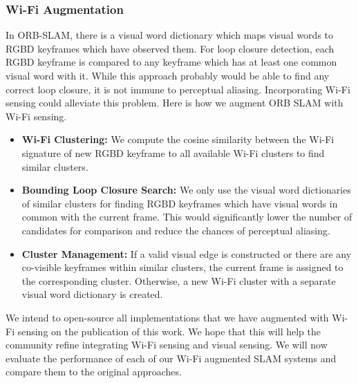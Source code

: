 \subsubsection{\textbf{Wi-Fi Augmentation}}
In ORB-SLAM, there is a visual word dictionary which maps visual words to RGBD keyframes which have observed them. For loop closure detection, each RGBD keyframe is compared to any keyframe which has at least one common visual word with it. While this approach probably would be able to find any correct loop closure, it is not immune to perceptual aliasing. Incorporating Wi-Fi sensing could alleviate this problem. Here is how we augment ORB SLAM with Wi-Fi sensing.
\begin{itemize}
\item \textbf{Wi-Fi Clustering:} We compute the cosine similarity between the Wi-Fi signature of new RGBD keyframe to all available Wi-Fi clusters to find {similar clusters}. 
\item \textbf{Bounding Loop Closure Search:} We only use the visual word dictionaries of {similar clusters} for finding RGBD keyframes which have visual words in common with the current frame. This would significantly lower the number of candidates for comparison and reduce the chances of perceptual aliasing.
\item \textbf{Cluster Management:} If a valid visual edge is constructed or there are any co-visible keyframes within {similar clusters}, the current frame is assigned to the corresponding cluster. Otherwise, a new Wi-Fi cluster with a separate visual word dictionary is created.
\end{itemize} 
We intend to open-source all implementations that we have augmented with Wi-Fi sensing on the publication of this work. We hope that this will help the community refine integrating Wi-Fi sensing and visual sensing. We will now evaluate the performance of each of our Wi-Fi augmented SLAM systems and compare them to the original approaches. 
